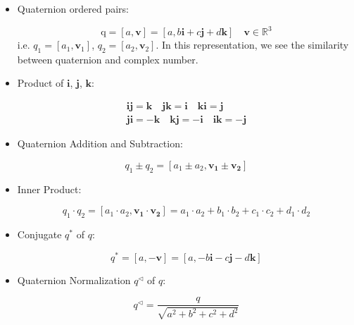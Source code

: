 \documentclass[letterpaper]{article} \usepackage{aaai20}  \usepackage{times}  \usepackage{helvet} \usepackage{courier}  \usepackage[hyphens]{url}  \usepackage{graphicx} \usepackage{lineno,hyperref,amsmath,amssymb}
\begin{document}
\begin{itemize}

\item Quaternion ordered pairs:

\begin{equation}
\mathrm{q}=[a, \mathbf{v}]=[a, b \mathbf{i}+c \mathbf{j}+d \mathbf{k}] \quad \mathbf{v} \in \mathbb{R}^{3}
\end{equation}i.e. $q_1=[a_1, \mathbf{v}_1]$, $q_2=[a_2, \mathbf{v}_2]$. In this representation, we see the similarity between quaternion and complex number.

\item Product of $\mathbf{i}$, $\mathbf{j}$, $\mathbf{k}$:

\begin{equation}
\begin{array}{c}
\mathbf{i} \mathbf{j}=\mathbf{k} \quad \mathbf{j} \mathbf{k}=\mathbf{i} \quad \mathbf{k} \mathbf{i}=\mathbf{j} \\
\mathbf{j i}=-\mathbf{k} \quad \mathbf{k} \mathbf{j}=-\mathbf{i} \quad \mathbf{i} \mathbf{k}=-\mathbf{j}
\end{array}
\end{equation}

\item Quaternion Addition and Subtraction:

\begin{equation}
q_{1} \pm q_{2}=\left[a_{1} \pm a_{2}, \mathbf{v}_{\mathbf{1}} \pm \mathbf{v}_{\mathbf{2}}\right]
\end{equation}

\item Inner Product:

\begin{equation}
q_{1} \cdot q_{2}=\left[a_{1} \cdot a_{2}, \mathbf{v}_{\mathbf{1}} \cdot \mathbf{v}_{\mathbf{2}}\right]=a_{1} \cdot a_{2}+b_{1} \cdot b_{2}+c_{1} \cdot c_{2}+d_{1} \cdot d_{2}
\end{equation}

\item Conjugate $q^*$ of $q$:

\begin{equation}
q^{*}=[a,-\mathbf{v}]=[a,-b \mathbf{i}-c \mathbf{j}-d \mathbf{k}]
\end{equation}

\item Quaternion Normalization $q^ \triangleleft$ of $q$:

\begin{equation}
q^{\triangleleft}=\frac{q}{\sqrt{a^{2}+b^{2}+c^{2}+d^{2}}}
\end{equation}


\end{itemize}
\end{document}
